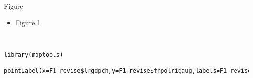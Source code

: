 \documentclass[a4paper,11pt]{article}
\begin{document}

\thispagestyle{empty}




%



\newpage




\newpage
\tableofcontents
\clearpage


\newpage
{}




\newpage
{}
\ohead[]{\rightmark}
\listoffigures



\newpage
{}
\listoftables



\newpage
\pagestyle{plain}
\setcounter{page}{1}    %




\newpage

Figure
\begin{itemize}
	\item Figure.1
\end{itemize}
\\
\begin{lstlisting}
library(maptools)

pointLabel(x=F1_revise$lrgdpch,y=F1_revise$fhpolrigaug,labels=F1_revise$code,col="black")
\end{lstlisting}
\\
\\
\end{document}
